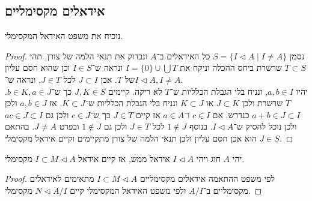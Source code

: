 \subsection{אידאלים מקסימליים}
נוכיח את משפט האידאל המקסימלי.
\begin{proof}
	נסמן $S = \{ I \triangleleft A \mid I \ne A \}$ כל האידאלים ב־$A$ ונבדוק את תנאי הלמה של צורן.
	תהי $T \subset S$ שרשרת ביחס ההכלה וניקח את $I = \{ 0 \} \cup \bigcup T$ ונראה ש־$I \in S$ וכן שהוא חסם עליון של $T$.
	אכן $J \subset I$ לכל $J \in T$, ונראה ש־$I \triangleleft A, I \ne A$. \\
	יהיו $a, b \in I$, ונניח בלי הגבלת הכלליות ש־$T$ לא ריקה. קיימים $J, K \in S$ כך ש־$b \in K, a \in J$.
	$T$ שרשרת ולכן $J \subset K$ או $K \subset J$ ונניח בלי הגבלת הכלליות ש־$K \subset J$.
	אז $a, b \in J$ ולכן $a + b \in J \subset I$ כנדרש.
	אם $c \in I$ ו־$a \in A$ אז קיים $J \in T$ כך ש־$c \in J$ ולכן גם $a c \in J \subset I$ ולכן נוכל להסיק ש־$I \triangleleft A$.
	בנוסף $1 \notin J$ לכל $J \in T$ ולכן גם $1 \notin J$ ובפרט $J \ne A$.
	בהתאם $J \in S$ הוא אכן חסם עליון ולכן תנאי הלמה של צורן מתקיימים וקיים אידאל מקסימלי.
\end{proof}
\begin{corollary}
	יהי $A$ חוג ויהי $I \triangleleft A$ אידאל ממש, אז קיים אידאל $I \subset M \triangleleft A$ מקסימלי.
\end{corollary}
\begin{proof}
	לפי משפט ההתאמה אידאלים מקסימליים $I \subset M \triangleleft A$ מתאימים לאידאלים מקסימליים ב־$A / I$ ולפי משפט האידאל המקסימלי קיים $N \triangleleft A / I$ מקסימלי.
\end{proof}

